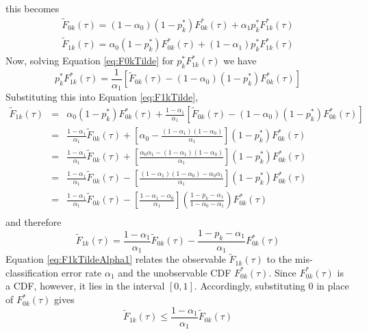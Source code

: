 \documentclass[12pt]{article}
\begin{document}
this becomes
\begin{eqnarray}
  \label{eq:F0kTilde}
  \widetilde{F}_{0k}(\tau) = (1 - \alpha_0) (1 - p^*_k)F_{0k}^*(\tau) + \alpha_1 p_k^* F_{1k}^*(\tau)\\ 
  \label{eq:F1kTilde}
  \widetilde{F}_{1k}(\tau)  = \alpha_0 (1 - p_k^*) F_{0k}^*(\tau) + (1 - \alpha_1)p_k^* F_{1k}^*(\tau)
\end{eqnarray}
Now, solving Equation \ref{eq:F0kTilde} for $p_k^* F_{1k}^*(\tau)$ we have
\[
  p_{k}^* F_{1k}^*(\tau) = \frac{1}{\alpha_1}\left[ \widetilde{F}_{0k}(\tau) - (1 - \alpha_0) (1 - p_k^*) F_{0k}^*(\tau)\right]
\]
Substituting this into Equation \ref{eq:F1kTilde},
\begin{eqnarray*}
  \widetilde{F}_{1k}(\tau) &=&  \alpha_0 (1 - p_k^*) F_{0k}^*(\tau) + \frac{1 - \alpha_1}{\alpha_1} \left[ \widetilde{F}_{0k}(\tau) - (1 - \alpha_0) ( 1 - p_k^*)F_{0k}^*(\tau) \right]\\
  &=& \frac{1 - \alpha_1}{\alpha_1} \widetilde{F}_{0k}(\tau) + \left[ \alpha_0 - \frac{(1 - \alpha_1)(1 - \alpha_0)}{\alpha_1} \right](1 - p_k^*) F_{0k}^*(\tau)\\
  &=& \frac{1 - \alpha_1}{\alpha_1} \widetilde{F}_{0k}(\tau) + \left[ \frac{\alpha_0 \alpha_1 - (1 - \alpha_1)(1 - \alpha_0)}{\alpha_1} \right](1 - p_k^*) F_{0k}^*(\tau)\\
  &=& \frac{1 - \alpha_1}{\alpha_1} \widetilde{F}_{0k}(\tau) - \left[ \frac{ (1 - \alpha_1)(1 - \alpha_0) - \alpha_0 \alpha_1}{\alpha_1} \right](1 - p_k^*) F_{0k}^*(\tau)\\
  &=& \frac{1 - \alpha_1}{\alpha_1} \widetilde{F}_{0k}(\tau) - \left[ \frac{ 1 - \alpha_1 -  \alpha_0 }{\alpha_1} \right]\left( \frac{1 - p_k - \alpha_1}{1 - \alpha_0 - \alpha_1} \right) F_{0k}^*(\tau)\\
\end{eqnarray*}
and therefore
\begin{equation}
  \widetilde{F}_{1k}(\tau) = \frac{1 - \alpha_1}{\alpha_1} \widetilde{F}_{0k}(\tau) -  \frac{1 - p_k - \alpha_1}{\alpha_1}  F_{0k}^*(\tau)
  \label{eq:F1kTildeAlpha1}
\end{equation}
Equation \ref{eq:F1kTildeAlpha1} relates the observable $\widetilde{F}_{1k}(\tau)$ to the mis-classification error rate $\alpha_1$ and the unobservable CDF $F_{0k}^*\left( \tau \right)$.
Since $F_{0k}^*(\tau)$ is a CDF, however, it lies in the interval $\left[ 0,1 \right]$.
Accordingly, substituting $0$ in place of $F^*_{0k}(\tau)$ gives 
\begin{equation}
  \widetilde{F}_{1k}(\tau) \leq \frac{1 - \alpha_1}{\alpha_1}\widetilde{F}_{0k}(\tau)
  \label{eq:F1ktilde_F0kTilde_leq_a1}
\end{equation}
\end{document}
